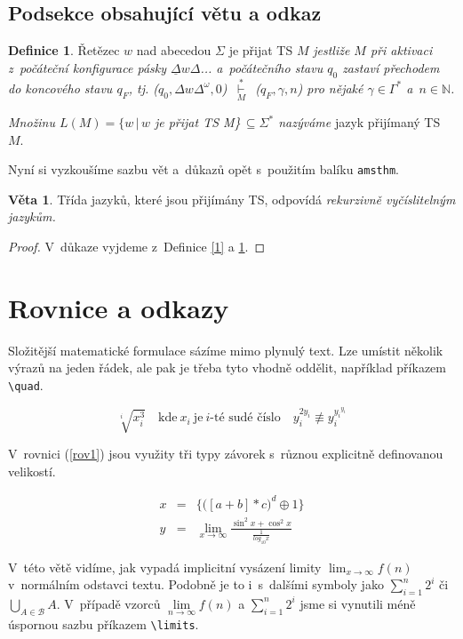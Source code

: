 \documentclass[a4paper, 11pt, twocolumn]{article}
\theoremstyle{definition}
\newtheorem{definition}{Definice}
\theoremstyle{definition}
\newtheorem{sentence}{Věta}
\begin{document}
\subsection{Podsekce obsahující větu a odkaz}
\begin{definition}\label{2}
Řetězec $w$ nad abecedou $\Sigma$ je přijat TS $M$\emph{ jestliže $M$ při aktivaci z~počáteční konfigurace pásky $\underline{\Delta}w\Delta$... a~počátečního stavu $q_{0}$ zastaví přechodem do koncového stavu $q_{F}$,  tj. ($q_{0}, \Delta w \Delta^\omega,0$) \,$\underset{M}{\overset{*}{\vdash}}\,$  ($q_{F},\gamma,n$) pro nějaké $\gamma \in \Gamma^*$ a~$n \in \mathbb{N}$.}

\emph{Množinu $L(M) = \{ w \,|\, w$ je přijat TS M\}\,$\subseteq  \Sigma^*$
nazýváme} jazyk přijímaný TS $M$.
\end{definition}

Nyní si vyzkoušíme sazbu vět a~důkazů opět s~použitím balíku \texttt{amsthm}.
\begin{sentence}
Třída jazyků, které jsou přijímány TS, odpovídá
\emph{rekurzivně vyčíslitelným jazykům.}
\end{sentence}
\begin{proof}
V~důkaze vyjdeme z~Definice \ref{1} a \ref{2}.
\end{proof}
\section{Rovnice a odkazy}
Složitější matematické formulace sázíme mimo plynulý
text. Lze umístit několik výrazů na jeden řádek, ale pak je
třeba tyto vhodně oddělit, například příkazem \verb|\quad|.

$$ 
 \sqrt[i]{x^3_i}
 \quad \text{kde}\ x_i\ \mathrm{je}\ i\text{-té sudé číslo}
 \quad y_i^{2y_i} \not\equiv y_i^{{y_i}^{y_i}}
$$

V~rovnici (\ref{rov1}) jsou využity tři typy závorek s~různou
explicitně definovanou velikostí.


\begin{eqnarray}\label{rov1}
	x& = &\label{eq_1} \bigg\{\Big([a + b] * c\Big)^d \oplus 1 \bigg\}\\
	y& = &\lim_{x\to\infty} \frac{\sin^2x + \cos^2x}{\frac{1}{log_{10} x}}  \nonumber
\end{eqnarray}

V~této větě vidíme, jak vypadá implicitní vysázení limity $\lim_{x\to\infty}f(n)$
v~normálním odstavci textu. Podobně je to i~s~dalšími symboly jako $ \sum^n_{i=1} 2^i$ či $ \bigcup_{A \in \mathcal{B}} A$.  V~případě vzorců $ \lim\limits_{n\to\infty}f(n)$ a $\sum\limits_{i=1}^{n} 2^{i}$ jsme si vynutili méně úspornou sazbu příkazem \verb|\limits|.
\end{document}
